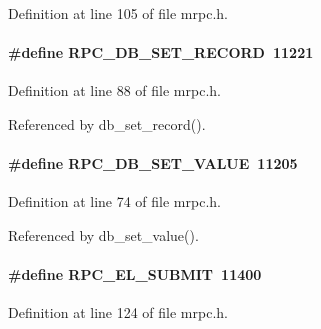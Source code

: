 Definition at line 105 of file mrpc.h.
\paragraph[{RPC\_\-DB\_\-SET\_\-RECORD}]{\setlength{\rightskip}{0pt plus 5cm}\#define RPC\_\-DB\_\-SET\_\-RECORD~11221}\hfill\label{group__mrpcdefineh_gae9ad48800bf41aa6ae8c3ade34953033}

\begin{DoxyItemize}
\item 
\end{DoxyItemize}

Definition at line 88 of file mrpc.h.

Referenced by db\_\-set\_\-record().
\paragraph[{RPC\_\-DB\_\-SET\_\-VALUE}]{\setlength{\rightskip}{0pt plus 5cm}\#define RPC\_\-DB\_\-SET\_\-VALUE~11205}\hfill\label{group__mrpcdefineh_ga4ecc165164d5365cc130d75fa918f332}

\begin{DoxyItemize}
\item 
\end{DoxyItemize}

Definition at line 74 of file mrpc.h.

Referenced by db\_\-set\_\-value().
\paragraph[{RPC\_\-EL\_\-SUBMIT}]{\setlength{\rightskip}{0pt plus 5cm}\#define RPC\_\-EL\_\-SUBMIT~11400}\hfill\label{group__mrpcdefineh_ga01e8cb480d2e147d0df7075f7c16fd43}

\begin{DoxyItemize}
\item 
\end{DoxyItemize}

Definition at line 124 of file mrpc.h.


